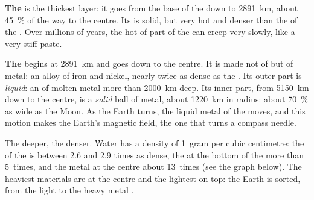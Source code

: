 \textbf{The } is the thickest layer: it goes from the base of the
 down to 2891~km, about 45~\% of the way to the centre. Its  is
solid, but very hot and denser than the  of the . Over millions of
years, the hot  of part of the  can creep very slowly, like a
very stiff paste.

\textbf{The } begins at 2891~km and goes down to the centre. It is
made not of  but of metal: an alloy of iron and nickel, nearly twice as
dense as the . Its outer part is \emph{liquid}: an  of molten
metal more than 2000~km deep. Its inner part, from 5150~km down to the
centre, is a \emph{solid} ball of metal, about 1220~km in radius: about 70~\% as wide as the Moon. As the Earth turns, the liquid metal of the
 moves, and this motion makes the Earth's magnetic field, the
one that turns a compass needle.

The deeper, the denser. Water has a density of 1~gram per cubic
centimetre: the  of the  is between 2.6 and 2.9 times as dense,
the  at the bottom of the  more than 5~times, and the metal at
the centre about 13~times (see the graph below). The heaviest materials are at the centre and the lightest on top: the Earth is sorted, from the light  to the heavy metal .


